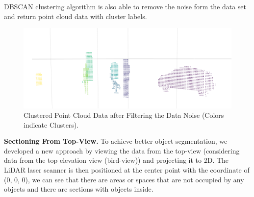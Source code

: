 DBSCAN clustering algorithm is also able to remove the noise form the data set and return point cloud data with cluster labels. 


\begin{figure}[!h]
\begin{center}
  \includegraphics[width=.85\linewidth]{./images/seg_noise_removal.png}
  \caption{Clustered Point Cloud Data after Filtering the Data Noise (Colors indicate Clusters). }
  \label{fig:ClusteringWithNoiseFiltering}
\end{center}
\end{figure}



\textbf{Sectioning From Top-View.}
To achieve better object segmentation, we developed a new approach by viewing the data from the top-view (considering data from the top elevation view (bird-view)) and projecting it to 2D. The LiDAR laser scanner is then positioned at the center point with the coordinate of (0, 0, 0), we can see that there are areas or spaces that are not occupied by any objects and there are sections with objects inside.     

 




